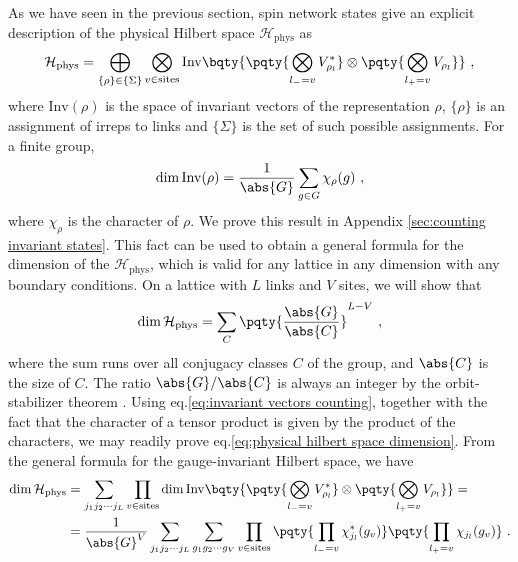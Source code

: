 As we have seen in the previous section, spin network states give an explicit description of the physical Hilbert space $\mathcal{H}_{\mathrm{phys}}$ as
\begin{equation}
    \mathcal{H}_{\mathrm{phys}} =\bigoplus_{\{\rho\} \in \{\Sigma\}} \bigotimes_{v \in \mathrm{sites}} \mathrm{Inv}\bqty{\pqty{\bigotimes_{l_- = v}  V_{\rho_l}^*} \otimes \pqty{\bigotimes_{l_+ = v}  V_{\rho_l}}} \ ,
\end{equation}
where $\mathrm{Inv}(\rho)$ is the space of invariant vectors of the representation $\rho$, $\{\rho\}$ is an assignment of irreps to links and $\{\Sigma\}$ is the set of such possible assignments.
For a finite group,
\begin{equation}
    \label{eq:invariant vectors counting}
    \dim{\mathrm{Inv}(\rho)} = \frac{1}{\abs{G}} \sum_{g \in G} \chi_\rho(g) \ ,
\end{equation}
where $\chi_\rho$ is the character of $\rho$.
We prove this result in Appendix \ref{sec:counting invariant states}.
This fact can be used to obtain a general formula for the dimension of the $\mathcal{H}_{\mathrm{phys}}$, which is valid for any lattice in any dimension with any boundary conditions.
On a lattice with $L$ links and $V$ sites, we will show that
\begin{equation}
    \label{eq:physical hilbert space dimension}
    \dim{\mathcal{H}_{\mathrm{phys}}} = \sum_C \pqty{\frac{\abs{G}}{\abs{C}}}^{L-V} \ ,
\end{equation}
where the sum runs over all conjugacy classes $C$ of the group, and $\abs{C}$ is the size of $C$.
The ratio $\abs{G}/\abs{C}$ is always an integer by the orbit-stabilizer theorem \cite{serre1967representations}.
Using eq.\eqref{eq:invariant vectors counting}, together with the fact that the character of a tensor product is given by the product of the characters, we may readily prove eq.\eqref{eq:physical hilbert space dimension}.
From the general formula for the gauge-invariant Hilbert space, we have
\begin{align}
    \dim{\mathcal{H}_{\mathrm{phys}}} &=\sum_{j_1 j_2 \cdots j_L} \prod_{v \in \mathrm{sites}} \dim\mathrm{Inv}\bqty{\pqty{\bigotimes_{l_- = v}  V_{\rho_l}^*} \otimes \pqty{\bigotimes_{l_+ = v}  V_{\rho_l}}} = \nonumber \\
    &=\frac{1}{\abs{G}^V}\sum_{j_1 j_2 \cdots j_L} \sum_{g_1 g_2 \cdots g_V} \prod_{v \in \mathrm{sites}} \pqty{\prod_{l_- = v}  \chi_{j_l}^*(g_v)}  \pqty{\prod_{l_+ = v} \chi_{j_l}(g_v)} \nonumber \ .
\end{align}

